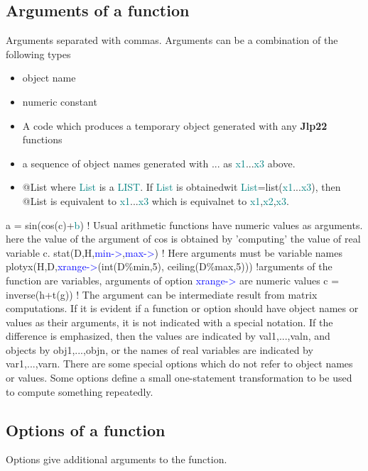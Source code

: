 {\subsection{Arguments of a function} 
\label{arguments} 
Arguments separated with commas. Arguments can be a combination of the following types 
\begin{itemize} 
\item object name 
\item numeric constant 
\item A code which produces a temporary object generated with any \textbf{Jlp22} functions 
\item a sequence of object names generated with ... as \textcolor{teal}{x1}...\textcolor{teal}{x3} above. 
\item @List where \textcolor{teal}{List} is a \textcolor{teal}{LIST}. If \textcolor{teal}{List} is obtainedwit \textcolor{teal}{List}=\textcolor{VioletRed}{list}(\textcolor{teal}{x1}...\textcolor{teal}{x3}), then 
@List is equivalent to \textcolor{teal}{x1}...\textcolor{teal}{x3} which is equivalnet to \textcolor{teal}{x1},\textcolor{teal}{x2},\textcolor{teal}{x3}. 
\end{itemize} 
a = \textcolor{VioletRed}{sin}(\textcolor{VioletRed}{cos}(c)+\textcolor{teal}{b}) ! Usual arithmetic functions have numeric values as arguments. 
here the value of the argument of cos is obtained by 'computing' the 
value of real variable c. 
\textcolor{VioletRed}{stat}(D,H,\textcolor{blue}{min->},\textcolor{blue}{max->}) ! Here arguments must be variable names 
\textcolor{VioletRed}{plotyx}(H,D,\textcolor{blue}{xrange->}(\textcolor{VioletRed}{int}(D\%min,5), \textcolor{VioletRed}{ceiling}(D\%max,5))) !arguments of the function are variables, arguments of option \textcolor{blue}{xrange->} are numeric values 
c = \textcolor{VioletRed}{inverse}(h+\textcolor{VioletRed}{t}(g)) ! The argument can be intermediate result from matrix computations. 
If it is evident if a function or option should have object names or values as their arguments, it 
is not indicated with a special notation. If the difference is emphasized, then the values are 
indicated by val1,...,valn, and objects by obj1,...,objn, or the names of real variables are 
indicated by var1,...,varn. 
There are some special options which do not refer to object names or values. Some options 
define a small one-statement transformation to be used to compute something repeatedly. 
 
\subsection{Options of a function} 
\label{options} 
Options give additional arguments to the function. 
}
